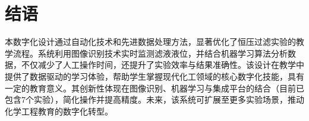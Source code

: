 
\section{结语}

本数字化设计通过自动化技术和先进数据处理方法，显著优化了恒压过滤实验的教学流程。系统利用图像识别技术实时监测滤液液位，并结合机器学习算法分析数据，不仅减少了人工操作时间，还提升了实验效率与结果准确性。该设计在教学中提供了数据驱动的学习体验，帮助学生掌握现代化工领域的核心数字化技能，具有一定的教育意义。其创新性体现在图像识别、机器学习与集成平台的结合（目前已包含7个实验），简化操作并提高精度。未来，该系统可扩展至更多实验场景，推动化学工程教育的数字化转型。